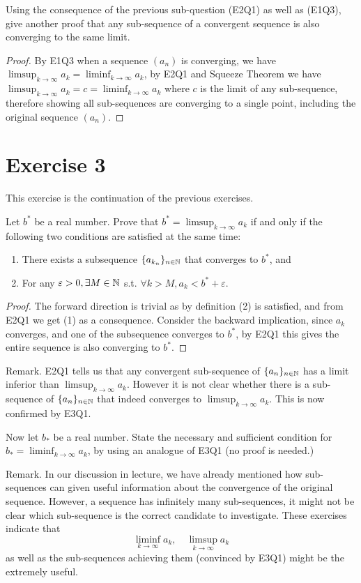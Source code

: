 \documentclass{homework}
\newcommand{\N}{\bb{N}} %
\newcommand{\ra}{\rightarrow}
\newcommand{\?}{\stackrel{?}{=}}
\newcommand{\ep}{\varepsilon}
\theoremstyle{definition}
\begin{document}
\question[2] Using the consequence of the previous sub-question (E2Q1) as well as (E1Q3), give another proof that any sub-sequence of a convergent sequence is also converging to the same limit.

\begin{proof}
    By E1Q3 when a sequence $(a_n)$ is converging, we have $\limsup_{k\ra\infty}a_k=\liminf_{k\ra\infty}a_k$, by E2Q1 and Squeeze Theorem we have $\limsup_{k\ra\infty}a_k=c=\liminf_{k\ra\infty}a_k$ where $c$ is the limit of any sub-sequence, therefore showing all sub-sequences are converging to a single point, including the original sequence $(a_n)$. 
\end{proof}


\newpage
\section*{Exercise 3}

This exercise is the continuation of the previous exercises.

\question[1] Let $b^*$ be a real number. Prove that $b^*=\limsup_{k\ra\infty}a_k$ if and only if the following two conditions are satisfied at the same time:
\begin{enumerate}
    \item There exists a subsequence $\{a_{k_n}\}_{n\in\N}$ that converges to $b^*$, and 
    \item For any $\ep>0, \exists M\in\N$ s.t. $\forall k>M, a_k<b^*+\ep$. 
\end{enumerate}
\begin{proof}
    The forward direction is trivial as by definition (2) is satisfied, and from E2Q1 we get (1) as a consequence. Consider the backward implication, since $a_k$ converges, and one of the subsequence converges to $b^*$, by E2Q1 this gives the entire sequence is also converging to $b^*$. 
\end{proof}


Remark. E2Q1 tells us that any convergent sub-sequence of $\{a_n\}_{n\in\N}$ has a limit inferior than $\limsup_{k\ra\infty}a_k$. However it is not clear whether there is a sub-sequence of $\{a_n\}_{n\in\N}$ that indeed converges to $\limsup_{k\ra\infty}a_k$. This is now confirmed by E3Q1.

\question[2] Now let $b_*$ be a real number. State the necessary and sufficient condition for $b_*=\liminf_{k\ra\infty}a_k$, by using an analogue of E3Q1 (no proof is needed.)

Remark. In our discussion in lecture, we have already mentioned how sub-sequences can given useful information about the convergence of the original sequence. However, a sequence has infinitely many sub-sequences, it might not be clear which sub-sequence is the correct candidate to investigate. These exercises indicate that \[\liminf_{k\ra\infty}a_k, \quad \limsup_{k\ra\infty}a_k\] as well as the sub-sequences achieving them (convinced by E3Q1) might be the extremely useful. 
\end{document}
